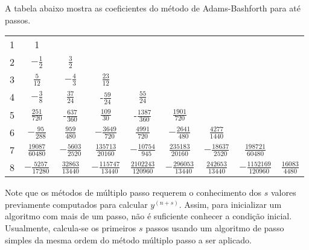 A tabela abaixo mostra as coeficientes do método de Adams-Bashforth para até passos. 
 \begin{center}
\begin{tabular}{|c|cccccccc|}
\hline
1 & 1 &&&&&&&\\
2 & $-\frac{1}{2}$ & $\frac{3}{2}$&&&&&&\\
3 & $\frac{5}{12}$ & $-\frac{4}{3}$ & $\frac{23}{12}$&&&&&\\
4 & $-\frac{3}{8}$ & $\frac{37}{24}$ & -$\frac{59}{24}$ & $\frac{55}{24}$&&&&\\
5 & $\frac{251}{720}$ & -$\frac{637}{360}$ & $\frac{109}{30}$& -$\frac{1387}{360}$& $\frac{1901}{720}$&&&\\
6 & $-{\frac {95}{288}}$ & ${\frac {959}{480}}$ & $-{\frac {3649}{720}}$ & ${\frac {4991}{720}}$ & $-{\frac {2641}{480}}$ & $\frac {4277}{1440}$&&\\
7 & $\frac {19087}{60480}$ & $-{\frac {5603}{2520}}$ & ${\frac {135713}{20160}}$ & $-{\frac {10754}{945}}$ & ${\frac {235183}{20160}}$ & $-{\frac {18637}{2520}}$ & ${\frac {198721}{60480}}$&\\
8 & $-{\frac {5257}{17280}}$&${\frac {32863}{13440}}$&$-{\frac {115747}{13440}}$&${\frac {2102243}{120960}}$&$-{\frac {296053}{13440}}$&${\frac {242653}{13440}}$&$-{\frac {1152169}{120960}}$&${\frac {16083}{4480}}$\\
\hline 
\end{tabular}
 \end{center}
\begin{obs} Note que os métodos de múltiplo passo requerem o conhecimento dos $s$ valores previamente computados para calcular $y^{(n+s)}$. Assim, para inicializar um algoritmo com mais de um passo, não é suficiente conhecer a condição inicial. Usualmente, calcula-se os primeiros $s$ passos usando um algoritmo de passo simples da mesma ordem do método múltiplo passo a ser aplicado.
\end{obs}



